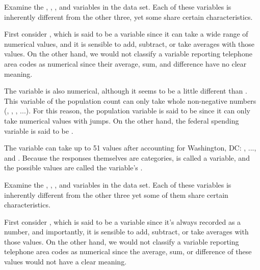 Examine the , , ,
and  variables in the 
data set. Each of these variables is inherently different from the
other three, yet some share certain characteristics.

First consider , which is said to be a  variable since it can take a wide range of numerical values, and it is sensible to add, subtract, or take averages with those values. On the other hand, we would not classify a variable reporting telephone area codes as numerical since their average, sum, and difference have no clear meaning.

The  variable is also numerical, although it seems to be a little different than . This variable of the population count can only take whole non-negative numbers (, , , ...). For this reason, the population variable is said to be  since it can only take numerical values with jumps. On the other hand, the federal spending variable is said to be .

The variable  can take up to 51 values after accounting for Washington, DC: , ..., and . Because the responses themselves are categories,  is called a  variable, and the possible values are called the variable's .

Examine the , ,
, and  variables
in the  data set.
Each of these variables is inherently different from the
other three yet some of them share certain characteristics.

First consider ,
which is said to be a  variable since
it's always recorded as a number, and importantly, it is
sensible to add, subtract, or take averages with those values.
On the other hand, we would not classify a variable
reporting telephone area codes as numerical since the
average, sum, or difference of these values would not have
a clear meaning.


